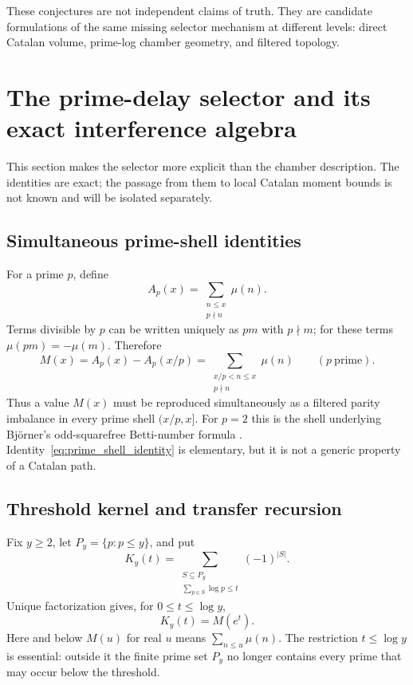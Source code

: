 \documentclass[11pt]{amsart}
\numberwithin{equation}{section}
\theoremstyle{plain}
\theoremstyle{definition}
\theoremstyle{remark}
\newcommand{\Mob}{\mu}
\newcommand{\Mert}{M}
\begin{document}
These conjectures are not independent claims of truth.  They are candidate formulations of the same missing selector mechanism at different levels: direct Catalan volume, prime-log chamber geometry, and filtered topology.

\section{The prime-delay selector and its exact interference algebra}
\label{sec:prime_delay_selector}

This section makes the selector more explicit than the chamber description.
The identities are exact; the passage from them to local Catalan moment bounds
is not known and will be isolated separately.

\subsection{Simultaneous prime-shell identities}

For a prime $p$, define
\begin{equation}
A_p(x)=\sum_{\substack{n\leq x\\p\nmid n}}\Mob(n).
\end{equation}
Terms divisible by $p$ can be written uniquely as $pm$ with $p\nmid m$;
for these terms $\Mob(pm)=-\Mob(m)$.  Therefore
\begin{equation}
\Mert(x)=A_p(x)-A_p(x/p)
=\sum_{\substack{x/p<n\leq x\\p\nmid n}}\Mob(n)
\qquad (p\ \text{prime}).
\label{eq:prime_shell_identity}
\end{equation}
Thus a value $\Mert(x)$ must be reproduced simultaneously as a filtered
parity imbalance in every prime shell $(x/p,x]$.  For $p=2$ this is the shell
underlying Bj\"orner's odd-squarefree Betti-number formula
\cite{Bjorner2011}.  Identity~\eqref{eq:prime_shell_identity} is elementary,
but it is not a generic property of a Catalan path.

\subsection{Threshold kernel and transfer recursion}

Fix $y\geq2$, let $P_y=\{p:p\leq y\}$, and put
\begin{equation}
K_y(t)=
\sum_{\substack{S\subseteq P_y\\
                  \sum_{p\in S}\log p\leq t}}
(-1)^{|S|}.
\label{eq:prime_threshold_kernel}
\end{equation}
Unique factorization gives, for $0\leq t\leq\log y$,
\begin{equation}
K_y(t)=\Mert(e^t).
\label{eq:kernel_equals_mertens}
\end{equation}
Here and below $\Mert(u)$ for real $u$ means $\sum_{n\leq u}\Mob(n)$.
The restriction $t\leq\log y$ is essential: outside it the finite prime set
$P_y$ no longer contains every prime that may occur below the threshold.
\end{document}
